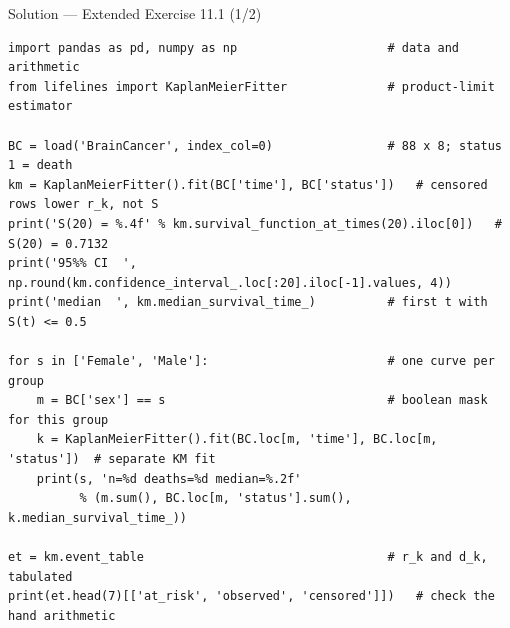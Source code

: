 \documentclass[aspectratio=169,11pt]{beamer}
\begin{document}
\begin{frame}[fragile]{Solution --- Extended Exercise 11.1 (1/2)}
\begin{solutionbox}
\begin{lstlisting}[basicstyle=\ttfamily\scriptsize]
import pandas as pd, numpy as np                     # data and arithmetic
from lifelines import KaplanMeierFitter              # product-limit estimator

BC = load('BrainCancer', index_col=0)                # 88 x 8; status 1 = death
km = KaplanMeierFitter().fit(BC['time'], BC['status'])   # censored rows lower r_k, not S
print('S(20) = %.4f' % km.survival_function_at_times(20).iloc[0])   # S(20) = 0.7132
print('95%% CI  ', np.round(km.confidence_interval_.loc[:20].iloc[-1].values, 4))
print('median  ', km.median_survival_time_)          # first t with S(t) <= 0.5

for s in ['Female', 'Male']:                         # one curve per group
    m = BC['sex'] == s                               # boolean mask for this group
    k = KaplanMeierFitter().fit(BC.loc[m, 'time'], BC.loc[m, 'status'])  # separate KM fit
    print(s, 'n=%d deaths=%d median=%.2f'
          % (m.sum(), BC.loc[m, 'status'].sum(), k.median_survival_time_))

et = km.event_table                                  # r_k and d_k, tabulated
print(et.head(7)[['at_risk', 'observed', 'censored']])   # check the hand arithmetic
\end{lstlisting}
\end{solutionbox}
\end{frame}
\end{document}
